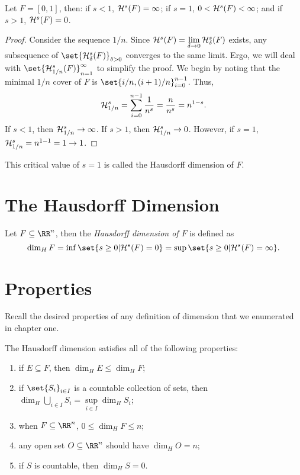 \begin{example}
	Let $F=[0,1]$, then: if $s < 1$, $\mathcal{H}^s(F)=\infty$; if $s=1$, $0 <\mathcal{H}^s(F) <\infty$; and if $s>1$, $\mathcal{H}^s(F)=0$.
\end{example}
\begin{proof}
	Consider the sequence $1/n$.
	Since $\mathcal{H}^s(F)=\lim\limits_{\delta\rightarrow0}\mathcal{H}^s_\delta(F)$ exists,
	any subsequence of $\set{\hm^s_\delta(F)}_{\delta>0}$ converges to the same limit.
	Ergo, we will deal with $\set{\hm^s_{1/n}(F)}_{n=1}^\infty$ to simplify the proof.
	We begin by noting that the minimal $1/n$ cover of $F$ is $\set{i/n,(i+1)/n}_{i=0}^{n-1}$.
	Thus,
	\[
		\mathcal{H}^s_{1/n}=\sum_{i=0}^{n-1}\frac{1}{n^s}=\frac{n}{n^s}=n^{1-s}.
	\]
	If $s < 1$, then $\mathcal{H}^s_{1/n}\rightarrow\infty$.
	If $s > 1$, then $\mathcal{H}^s_{1/n}\rightarrow 0$.
	However, if $s=1$, $\mathcal{H}^s_{1/n}=n^{1-1}=1\rightarrow 1$.
\end{proof}

This critical value of $s=1$ is called the Hausdorff dimension of $F$.

\section{The Hausdorff Dimension}

\begin{definition}
	Let $F\subseteq\RR^n$, then the \textit{Hausdorff dimension of $F$} is defined as
	\[
		\dim_H F = \inf\set{s\geq 0 | \hm^s(F) = 0} = \sup\set{s\geq 0 | \hm^s(F)=\infty}.
	\]
\end{definition}

\section{Properties}

Recall the desired properties of any definition of dimension that we enumerated in chapter one.

\begin{thm}
	The Hausdorff dimension satisfies all of the following properties:
	\begin{enumerate}
		\item if $E\subseteq F$, then $\dim_H E\leq\dim_H F$;
		\item if $\set{S_i}_{i\in I}$ is a countable collection of sets, then $\dim_H \bigcup_{i\in I} S_i = \sup\limits_{i\in I}\dim_H S_i$;
		\item when $F\subseteq \RR^n$, $0\leq \dim_H F\leq n$;
		\item any open set $O\subseteq \RR^n$ should have $\dim_H O = n$;
		\item if $S$ is countable, then $\dim_H S=0$.
	\end{enumerate}
\end{thm}


